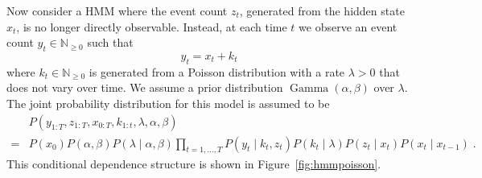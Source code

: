 \documentclass[twoside, 11pt]{article}
\DeclareMathOperator*{\gammad}{Gamma}
\newcommand{\nonnegint}[0] {\mathbb{N}_{\geq 0}}
\begin{document}
Now consider a HMM where the event count $z_t$, generated from the hidden state $x_t$, is no longer directly observable. Instead, at each time $t$ we observe an event count $y_t \in \nonnegint$ such that
\begin{equation}
y_t = x_t + k_t
\end{equation}
where $k_t \in \nonnegint$ is generated from a Poisson distribution with a rate $\lambda > 0$ that does not vary over time. We assume a prior distribution $\gammad(\alpha, \beta)$ over $\lambda$. The joint probability distribution for this model is assumed to be
\begin{align}
& P(y_{1:T}, z_{1:T}, x_{0:T}, k_{1:t}, \lambda, \alpha, \beta) \nonumber \\
= & P(x_0) P(\alpha, \beta) P(\lambda \mid \alpha, \beta) \prod_{t=1, \ldots, T} P(y_t \mid k_t, z_t) P(k_t \mid \lambda) P(z_t \mid x_t) P(x_t \mid x_{t-1} ) \; .
\end{align}
This conditional dependence structure is shown in Figure~\ref{fig:hmmpoisson}.
\end{document}
